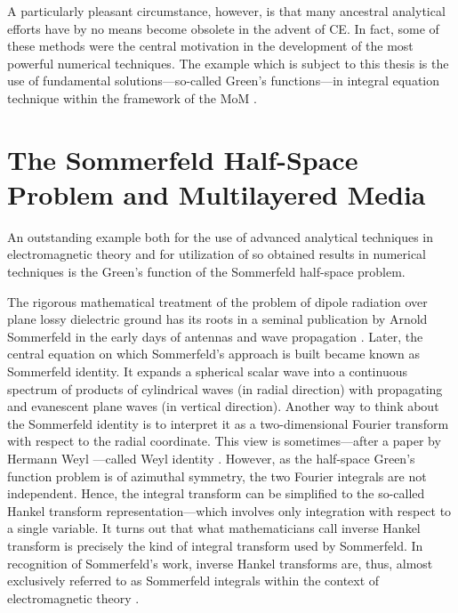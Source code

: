 A particularly pleasant circumstance, however, is that many ancestral
analytical efforts have by no means become obsolete in the advent of
\ac{CE}.
In fact, some of these methods were the central motivation in the development of 
the most powerful numerical techniques.
The example which is subject to this thesis is the use of fundamental
solutions---so-called Green's functions---in integral equation technique within
the framework of the \ac{MoM} \cite{Harrington1993}.








\section{The Sommerfeld Half-Space Problem and Multilayered Media}

An outstanding example both for the use of advanced analytical techniques in
electromagnetic theory and for utilization of so obtained results in numerical
techniques is the Green's function of the Sommerfeld half-space problem.

The rigorous mathematical treatment of the problem of dipole radiation over
plane lossy dielectric ground has its roots in a seminal publication by
Arnold Sommerfeld in the early days of antennas and wave propagation
\cite{Sommerfeld1909}.
Later, the central equation on which Sommerfeld's approach is built
\cite[eq.~(9),~p.~683]{Sommerfeld1909} became known as Sommerfeld
identity.
It expands a spherical scalar wave into a continuous spectrum of products
of cylindrical waves (in radial direction) with propagating and evanescent
plane waves (in vertical direction).
Another way to think about the Sommerfeld identity is to interpret it
as a two-dimensional Fourier transform with respect to the radial coordinate.
This view is sometimes---after a paper by Hermann Weyl \cite{Weyl1919}---called
Weyl identity \cite[65]{Chew1999}.
However, as the half-space Green's function problem is of azimuthal symmetry,
the two Fourier integrals are not independent.
Hence, the integral transform can be simplified to the so-called Hankel
transform representation---which involves only integration with respect to a
single variable.
It turns out that what mathematicians call inverse Hankel transform is
precisely the kind of integral transform used by Sommerfeld.
In recognition of Sommerfeld's work, inverse Hankel transforms are, thus,
almost exclusively referred to as Sommerfeld integrals within the
context of electromagnetic theory \cite{Mosig2021}.

